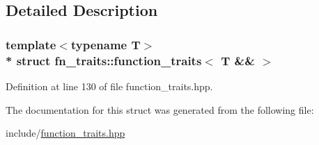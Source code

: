 \subsection{Detailed Description}
\subsubsection*{template$<$typename T$>$\\*
struct fn\+\_\+traits\+::function\+\_\+traits$<$ T \&\& $>$}



Definition at line 130 of file function\+\_\+traits.\+hpp.



The documentation for this struct was generated from the following file\+:\begin{DoxyCompactItemize}
\item 
include/\hyperlink{function__traits_8hpp}{function\+\_\+traits.\+hpp}\end{DoxyCompactItemize}
